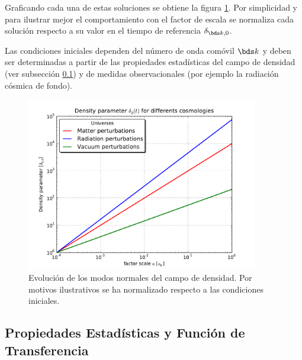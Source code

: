 

Graficando cada una de estas soluciones se obtiene la figura 
\ref{fig:DeltaEvolution}. Por simplicidad y para ilustrar mejor el 
comportamiento con el factor de escala se normaliza cada solución respecto 
a su valor en el tiempo de referencia $\delta_{\bds k, 0}$. 


Las condiciones iniciales dependen del número de onda comóvil $\bds k$ y
deben ser determinadas a partir de las propiedades estadísticas del campo 
de densidad (ver subsección \ref{subsec:StatisticalProperties}) y de 
medidas observacionales (por ejemplo la radiación cósmica de fondo).

\newpage

\begin{figure}[htbp]
	\centering
	\includegraphics[width=0.9\textwidth]
	{./figures/2_theoretical_framework/Perturbations_Evolution.pdf}

	\caption{\small{Evolución de los modos normales del campo de densidad.
	Por motivos ilustrativos se ha normalizado respecto a las condiciones 
	iniciales.}}
	
	\label{fig:DeltaEvolution}
\end{figure}


	\subsection{Propiedades Estadísticas y Función de Transferencia}
	\label{subsec:StatisticalProperties}


